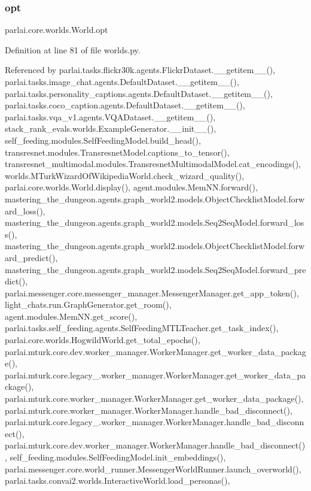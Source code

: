 \subsubsection{\texorpdfstring{opt}{opt}}
{\footnotesize\ttfamily parlai.\+core.\+worlds.\+World.\+opt}



Definition at line 81 of file worlds.\+py.



Referenced by parlai.\+tasks.\+flickr30k.\+agents.\+Flickr\+Dataset.\+\_\+\+\_\+getitem\+\_\+\+\_\+(), parlai.\+tasks.\+image\+\_\+chat.\+agents.\+Default\+Dataset.\+\_\+\+\_\+getitem\+\_\+\+\_\+(), parlai.\+tasks.\+personality\+\_\+captions.\+agents.\+Default\+Dataset.\+\_\+\+\_\+getitem\+\_\+\+\_\+(), parlai.\+tasks.\+coco\+\_\+caption.\+agents.\+Default\+Dataset.\+\_\+\+\_\+getitem\+\_\+\+\_\+(), parlai.\+tasks.\+vqa\+\_\+v1.\+agents.\+V\+Q\+A\+Dataset.\+\_\+\+\_\+getitem\+\_\+\+\_\+(), stack\+\_\+rank\+\_\+evals.\+worlds.\+Example\+Generator.\+\_\+\+\_\+init\+\_\+\+\_\+(), self\+\_\+feeding.\+modules.\+Self\+Feeding\+Model.\+build\+\_\+head(), transresnet.\+modules.\+Transresnet\+Model.\+captions\+\_\+to\+\_\+tensor(), transresnet\+\_\+multimodal.\+modules.\+Transresnet\+Multimodal\+Model.\+cat\+\_\+encodings(), worlds.\+M\+Turk\+Wizard\+Of\+Wikipedia\+World.\+check\+\_\+wizard\+\_\+quality(), parlai.\+core.\+worlds.\+World.\+display(), agent.\+modules.\+Mem\+N\+N.\+forward(), mastering\+\_\+the\+\_\+dungeon.\+agents.\+graph\+\_\+world2.\+models.\+Object\+Checklist\+Model.\+forward\+\_\+loss(), mastering\+\_\+the\+\_\+dungeon.\+agents.\+graph\+\_\+world2.\+models.\+Seq2\+Seq\+Model.\+forward\+\_\+loss(), mastering\+\_\+the\+\_\+dungeon.\+agents.\+graph\+\_\+world2.\+models.\+Object\+Checklist\+Model.\+forward\+\_\+predict(), mastering\+\_\+the\+\_\+dungeon.\+agents.\+graph\+\_\+world2.\+models.\+Seq2\+Seq\+Model.\+forward\+\_\+predict(), parlai.\+messenger.\+core.\+messenger\+\_\+manager.\+Messenger\+Manager.\+get\+\_\+app\+\_\+token(), light\+\_\+chats.\+run.\+Graph\+Generator.\+get\+\_\+room(), agent.\+modules.\+Mem\+N\+N.\+get\+\_\+score(), parlai.\+tasks.\+self\+\_\+feeding.\+agents.\+Self\+Feeding\+M\+T\+L\+Teacher.\+get\+\_\+task\+\_\+index(), parlai.\+core.\+worlds.\+Hogwild\+World.\+get\+\_\+total\+\_\+epochs(), parlai.\+mturk.\+core.\+dev.\+worker\+\_\+manager.\+Worker\+Manager.\+get\+\_\+worker\+\_\+data\+\_\+package(), parlai.\+mturk.\+core.\+legacy\+\_.\+worker\+\_\+manager.\+Worker\+Manager.\+get\+\_\+worker\+\_\+data\+\_\+package(), parlai.\+mturk.\+core.\+worker\+\_\+manager.\+Worker\+Manager.\+get\+\_\+worker\+\_\+data\+\_\+package(), parlai.\+mturk.\+core.\+worker\+\_\+manager.\+Worker\+Manager.\+handle\+\_\+bad\+\_\+disconnect(), parlai.\+mturk.\+core.\+legacy\+\_.\+worker\+\_\+manager.\+Worker\+Manager.\+handle\+\_\+bad\+\_\+disconnect(), parlai.\+mturk.\+core.\+dev.\+worker\+\_\+manager.\+Worker\+Manager.\+handle\+\_\+bad\+\_\+disconnect(), self\+\_\+feeding.\+modules.\+Self\+Feeding\+Model.\+init\+\_\+embeddings(), parlai.\+messenger.\+core.\+world\+\_\+runner.\+Messenger\+World\+Runner.\+launch\+\_\+overworld(), parlai.\+tasks.\+convai2.\+worlds.\+Interactive\+World.\+load\+\_\+personas(), 